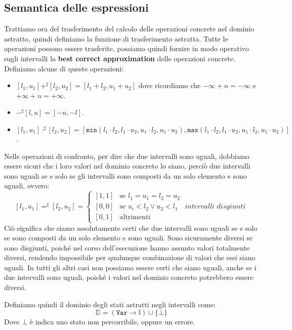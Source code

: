 \subsection{Semantica delle espressioni}
Trattiamo ora del trasferimento del calcolo delle operazioni concrete nel 
dominio astratto, quindi definiamo la funzione di trasferimento astratta.
Tutte le operazioni possono essere trasferite, possiamo quindi fornire
in modo operativo sugli intervalli la \textbf{best correct approximation}
delle operazioni concrete. Definiamo alcune di queste operazioni:
\begin{itemize}
    \item $[l_1, u_1] +^\sharp [l_2, u_2] = [l_1 + l_2, u_1 + u_2]$ dove ricordiamo che 
    $-\infty + n = -\infty$ e $+\infty + n = +\infty$.
    \item $-^\sharp[l, u] = [-u, -l]$.
    \item $[l_1, u_1] \cdot^\sharp [l_2, u_2] = 
    [\texttt{min}(l_1 \cdot l_2, l_1 \cdot u_2, u_1 \cdot l_2, u_1 \cdot u_2), 
    \texttt{max}(l_1 \cdot l_2, l_1 \cdot u_2, u_1 \cdot l_2, u_1 \cdot u_2)]$.  
\end{itemize}
Nelle operazioni di confronto, per dire che due intervalli sono uguali,
dobbiamo essere sicuri che i loro valori nel dominio concreto lo 
siano, perciò due intervalli sono uguali se e solo se gli intervalli 
sono composti da un solo elemento e sono uguali, ovvero:
\[
  [l_1, u_1] =^\sharp [l_2, u_2] =
  \begin{cases}
    [1, 1] & \text{se } l_1 = u_1 = l_2 = u_2 \\
    [0, 0] & \text{se } u_i < l_2 \lor u_2 < l_1 \quad \textit{intervalli 
    disgiunti}\\
    [0, 1] & \text{altrimenti}
   \end{cases}
\]
Ciò significa che siamo assolutamente certi che due intervalli
sono uguali se e solo se sono composti da un solo elemento e sono uguali.
Sono sicuramente diversi se sono disgiunti, poiché nel corso dell'esecuzione 
hanno assunto valori totalmente diversi, rendendo impossibile per 
qualunque combinazione di valori che essi siano uguali. In tutti gli 
altri casi non possiamo essere certi che siano uguali, anche se i due 
intervalli sono uguali, poiché i valori nel dominio concreto potrebbero
essere diversi.

Definiamo quindi il dominio degli stati astratti negli intervalli come:
\[
  \mathbb{D} = (\texttt{Var} \to \mathbb{I}) \cup \{\bot\}
\]
Dove $\bot$ è indica uno stato non percorribile, oppure un errore.

